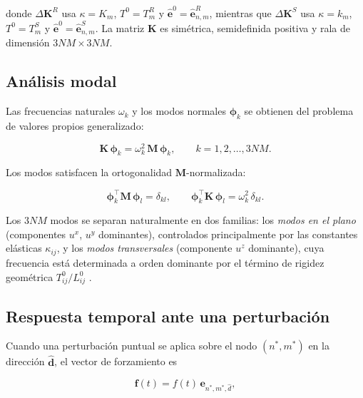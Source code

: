 \documentclass[11pt,letterpaper]{article}
\begin{document}
donde $\Delta\mathbf{K}^{R}$ usa $\kappa=K_m$, $T^0=T^R_m$ y
$\hat{\mathbf{e}}^0=\hat{\mathbf{e}}^{R}_{n,m}$, mientras que
$\Delta\mathbf{K}^{S}$ usa $\kappa=k_m$, $T^0=T^S_m$ y
$\hat{\mathbf{e}}^0=\hat{\mathbf{e}}^{S}_{n,m}$. La matriz $\mathbf{K}$
es simétrica, semidefinida positiva y rala de dimensión
$3NM\times 3NM$.

\subsection{Análisis modal}

Las frecuencias naturales $\omega_k$ y los modos normales
$\boldsymbol{\phi}_k$ se obtienen del problema de valores propios
generalizado:

\begin{equation}\label{eq:evp}
    \mathbf{K}\,\boldsymbol{\phi}_k
    = \omega_k^2\,\mathbf{M}\,\boldsymbol{\phi}_k,
    \qquad k = 1, 2, \dots, 3NM.
\end{equation}

Los modos satisfacen la ortogonalidad $\mathbf{M}$-normalizada:

\begin{equation}\label{eq:ortog}
    \boldsymbol{\phi}_k^\top\mathbf{M}\,\boldsymbol{\phi}_l = \delta_{kl},
    \qquad
    \boldsymbol{\phi}_k^\top\mathbf{K}\,\boldsymbol{\phi}_l
    = \omega_k^2\,\delta_{kl}.
\end{equation}

Los $3NM$ modos se separan naturalmente en dos familias: los \emph{modos
en el plano} (componentes $u^x$, $u^y$ dominantes), controlados
principalmente por las constantes elásticas $\kappa_{ij}$, y los
\emph{modos transversales} (componente $u^z$ dominante), cuya frecuencia
está determinada a orden dominante por el término de rigidez geométrica
$T^0_{ij}/L^0_{ij}$ \cite{lott2022,mortimer2019decoding,frohlich1982}.

\subsection{Respuesta temporal ante una perturbación}

Cuando una perturbación puntual se aplica sobre el nodo $(n^*,m^*)$ en
la dirección $\hat{\mathbf{d}}$, el vector de forzamiento es

\begin{equation}\label{eq:forzamiento}
    \mathbf{f}(t) = f(t)\,\mathbf{e}_{n^*,m^*,\hat{d}},
\end{equation}
\end{document}
